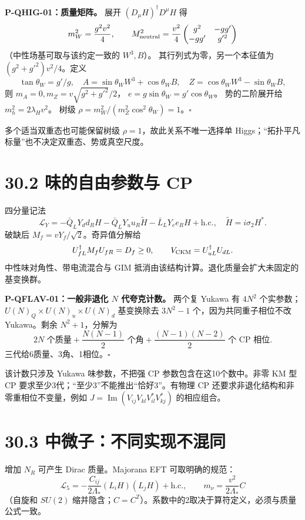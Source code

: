 \documentclass[
  11pt,
  oneside]{book}
\begin{document}
\protect\hypertarget{p-qhig-01}{}{}

\textbf{P-QHIG-01：质量矩阵。} 展开 \((D_\mu H)^\dagger D^\mu H\) 得 \[
m_W^2=\frac{g^2v^2}{4},\qquad
M_{\rm neutral}^2=\frac{v^2}{4}
\begin{pmatrix}g^2&-gg'\\-gg'&g'^2\end{pmatrix}
\] （中性场基可取与该约定一致的 \(W^3,B\)）。
其行列式为零，另一个本征值为 \((g^2+g'^2)v^2/4\)。定义 \[
\tan\theta_W=g'/g,\quad
A=\sin\theta_W W^3+\cos\theta_W B,\quad
Z=\cos\theta_W W^3-\sin\theta_W B,
\] 则 \(m_A=0,m_Z=v\sqrt{g^2+g'^2}/2\)，
\(e=g\sin\theta_W=g'\cos\theta_W\)。 势的二阶展开给
\(m_h^2=2\lambda_Hv^2\)。 树级
\(\rho=m_W^2/(m_Z^2\cos^2\theta_W)=1\)。\(\square\)

多个适当双重态也可能保留树级 \(\rho=1\)，故此关系不唯一选择单
Higgs；``拓扑平凡标量''也不决定双重态、势或真空尺度。

\section{30.2 味的自由参数与 CP}

四分量记法 \[
\mathcal L_Y=-\bar Q_LY_dd_RH-\bar Q_LY_uu_R\widetilde H
-\bar L_LY_ee_RH+\mathrm{h.c.},\quad \widetilde H=i\sigma_2H^*.
\] 破缺后 \(M_f=vY_f/\sqrt2\)。奇异值分解给 \[
U_{fL}^\dagger M_fU_{fR}=D_f\ge0,\qquad
V_{\rm CKM}=U_{uL}^\dagger U_{dL}.
\] 中性味对角性、带电流混合与 GIM
抵消由该结构计算。退化质量会扩大未固定的基变换群。

\protect\hypertarget{p-qflav-01}{}{}

\textbf{P-QFLAV-01：一般非退化 \(N\) 代夸克计数。} 两个复 Yukawa 有
\(4N^2\) 个实参数；\(U(N)_Q\times U(N)_u\times U(N)_d\) 基变换除去
\(3N^2-1\) 个，因为共同重子相位不改 Yukawa。剩余 \(N^2+1\)，分解为 \[
2N\text{ 个质量}+\frac{N(N-1)}2\text{ 个角}
+\frac{(N-1)(N-2)}2\text{ 个 CP 相位}.
\] 三代给6质量、3角、1相位。\(\square\)

该计数只涉及 Yukawa 味参数，不把强 CP 参数包含在这10个数中。非零 KM 型
CP 要求至少3代；``至少3''不能推出``恰好3''。有物理 CP
还要求非退化结构和非零重相位不变量，例如
\(J=\operatorname{Im}(V_{ij}V_{kl}V^*_{il}V^*_{kj})\) 的相应组合。

\section{30.3 中微子：不同实现不混同}

增加 \(N_R\) 可产生 Dirac 质量。Majorana EFT 可取明确的规范： \[
\mathcal L_5=-\frac{C_{ij}}{2\Lambda_*}(L_iH)(L_jH)+\mathrm{h.c.},
\qquad m_\nu=\frac{v^2}{2\Lambda_*}C
\] （自旋和 \(SU(2)\)
缩并隐含；\(C=C^T\)）。系数中的2取决于算符定义，必须与质量公式一致。
\end{document}
